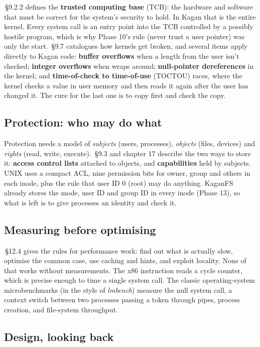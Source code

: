 \documentclass[11pt,a4paper]{article}
\begin{document}
\MOS\,\S9.2.2 defines the \textbf{trusted computing base} (TCB): the hardware and software that must be correct for
the system's security to hold. In Kagan that is the entire kernel. Every system call is an entry point into the TCB
controlled by a possibly hostile program, which is why Phase 10's rule (never trust a user pointer) was only the
start. \MOS\,\S9.7 catalogues how kernels get broken, and several items apply directly to Kagan code:
\textbf{buffer overflows} when a length from the user isn't checked; \textbf{integer overflows} when
 wraps around; \textbf{null-pointer dereferences} in the kernel; and \textbf{time-of-check to
time-of-use} (TOCTOU) races, where the kernel checks a value in user memory and then reads it again after the user has
changed it. The cure for the last one is to copy first and check the copy.

\subsection{Protection: who may do what}

Protection needs a model of \emph{subjects} (users, processes), \emph{objects} (files, devices) and \emph{rights}
(read, write, execute). \MOS\,\S9.3 and \OSC chapter 17 describe the two ways to store it: \textbf{access control
lists} attached to objects, and \textbf{capabilities} held by subjects. UNIX uses a compact ACL, nine permission bits
for owner, group and others in each inode, plus the rule that user ID 0 (root) may do anything. KaganFS already stores
the mode, user ID and group ID in every inode (Phase 13), so what is left is to give processes an identity and check it.

\subsection{Measuring before optimising}

\MOS\,\S12.4 gives the rules for performance work: find out what is actually slow, optimise the common case, use
caching and hints, and exploit locality. None of that works without measurements. The x86  instruction
reads a cycle counter, which is precise enough to time a single system call. The classic operating-system
microbenchmarks (in the style of \emph{lmbench}) measure the null system call, a context switch between two processes
passing a token through pipes, process creation, and file-system throughput.

\subsection{Design, looking back}
\end{document}
